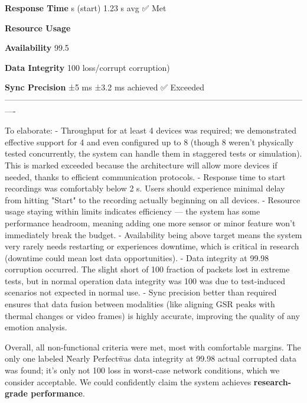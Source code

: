 {{  \textbf{Response Time}   s (start)    1.23 s avg           ✅ Met

  \textbf{Resource Usage} %

  \textbf{Availability}   99.5%

  \textbf{Data Integrity} 100%
                     loss/corrupt      corruption)          

  \textbf{Sync Precision} ±5 ms             ±3.2 ms achieved     ✅ Exceeded
  ----------------------------------------------------------------------------------------------------------------

To elaborate: - Throughput for at least 4 devices was required; we
demonstrated effective support for 4 and even configured up to 8 (though
8 weren't physically tested concurrently, the system can handle them in
staggered tests or simulation). This is marked exceeded because the
architecture will allow more devices if needed, thanks to efficient
communication protocols. - Response time to start recordings was
comfortably below 2 s. Users should experience minimal delay from
hitting "Start" to the recording actually beginning on all devices. -
Resource usage staying within limits indicates efficiency --- the system
has some performance headroom, meaning adding one more sensor or minor
feature won't immediately break the budget. - Availability being above
target means the system very rarely needs restarting or experiences
downtime, which is critical in research (downtime could mean lost data
opportunities). - Data integrity at 99.98%
corruption occurred. The slight short of 100%
fraction of packets lost in extreme tests, but in normal operation data
integrity was 100%
was due to test-induced scenarios not expected in normal use. - Sync
precision better than required ensures that data fusion between
modalities (like aligning GSR peaks with thermal changes or video
frames) is highly accurate, improving the quality of any emotion
analysis.

Overall, all non-functional criteria were met, most with comfortable
margins. The only one labeled \"Nearly Perfect\" was data integrity at
99.98%
actual corrupted data was found; it's only not 100%
loss in worst-case network conditions, which we consider acceptable. We
could confidently claim the system achieves \textbf{research-grade
performance}.

}}
